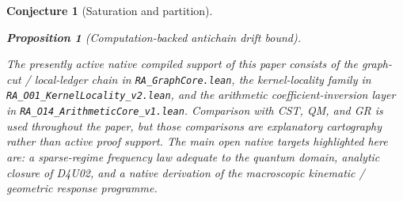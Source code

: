 \documentclass[11pt]{article}
\newtheorem{proposition}{Proposition}
\newtheorem{conjecture}{Conjecture}
\begin{document}
\begin{conjecture}[Saturation and partition]
\begin{proposition}[Computation-backed antichain drift bound]
\begin{tcolorbox}[title=Scope of the active native support layer,colback=gray!5,colframe=gray!60]
The presently active native compiled support of this paper consists of the graph-cut / local-ledger chain in \texttt{RA\_GraphCore.lean}, the kernel-locality family in \texttt{RA\_O01\_KernelLocality\_v2.lean}, and the arithmetic coefficient-inversion layer in \texttt{RA\_O14\_ArithmeticCore\_v1.lean}. Comparison with CST, QM, and GR is used throughout the paper, but those comparisons are explanatory cartography rather than active proof support. The main open native targets highlighted here are: a sparse-regime frequency law adequate to the quantum domain, analytic closure of D4U02, and a native derivation of the macroscopic kinematic / geometric response programme.
\end{tcolorbox}


\end{proposition}
\end{conjecture}
\end{document}
